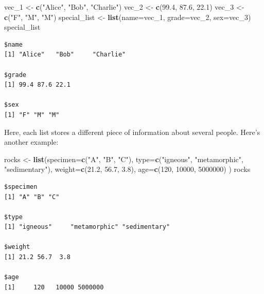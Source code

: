 \documentclass[
]{article}
\newenvironment{Shaded}{\begin{snugshade}}{\end{snugshade}}
\newcommand{\DataTypeTok}[1]{\textcolor[rgb]{0.13,0.29,0.53}{#1}}
\newcommand{\DecValTok}[1]{\textcolor[rgb]{0.00,0.00,0.81}{#1}}
\newcommand{\FloatTok}[1]{\textcolor[rgb]{0.00,0.00,0.81}{#1}}
\newcommand{\KeywordTok}[1]{\textcolor[rgb]{0.13,0.29,0.53}{\textbf{#1}}}
\newcommand{\NormalTok}[1]{#1}
\newcommand{\StringTok}[1]{\textcolor[rgb]{0.31,0.60,0.02}{#1}}
\begin{document}
\begin{Shaded}
\begin{Highlighting}[]
\NormalTok{vec_}\DecValTok{1}\NormalTok{ <-}\StringTok{ }\KeywordTok{c}\NormalTok{(}\StringTok{"Alice"}\NormalTok{, }\StringTok{"Bob"}\NormalTok{, }\StringTok{"Charlie"}\NormalTok{)}
\NormalTok{vec_}\DecValTok{2}\NormalTok{ <-}\StringTok{ }\KeywordTok{c}\NormalTok{(}\FloatTok{99.4}\NormalTok{, }\FloatTok{87.6}\NormalTok{, }\FloatTok{22.1}\NormalTok{)}
\NormalTok{vec_}\DecValTok{3}\NormalTok{ <-}\StringTok{ }\KeywordTok{c}\NormalTok{(}\StringTok{"F"}\NormalTok{, }\StringTok{"M"}\NormalTok{, }\StringTok{"M"}\NormalTok{)}
\NormalTok{special_list <-}\StringTok{ }\KeywordTok{list}\NormalTok{(}\DataTypeTok{name=}\NormalTok{vec_}\DecValTok{1}\NormalTok{, }\DataTypeTok{grade=}\NormalTok{vec_}\DecValTok{2}\NormalTok{, }\DataTypeTok{sex=}\NormalTok{vec_}\DecValTok{3}\NormalTok{)}
\NormalTok{special_list}
\end{Highlighting}
\end{Shaded}

\begin{verbatim}
$name
[1] "Alice"   "Bob"     "Charlie"

$grade
[1] 99.4 87.6 22.1

$sex
[1] "F" "M" "M"
\end{verbatim}

Here, each list stores a different piece of information about several people.
Here's another example:

\begin{Shaded}
\begin{Highlighting}[]
\NormalTok{rocks <-}\StringTok{ }\KeywordTok{list}\NormalTok{(}\DataTypeTok{specimen=}\KeywordTok{c}\NormalTok{(}\StringTok{"A"}\NormalTok{, }\StringTok{"B"}\NormalTok{, }\StringTok{"C"}\NormalTok{),}
              \DataTypeTok{type=}\KeywordTok{c}\NormalTok{(}\StringTok{"igneous"}\NormalTok{, }\StringTok{"metamorphic"}\NormalTok{, }\StringTok{"sedimentary"}\NormalTok{),}
              \DataTypeTok{weight=}\KeywordTok{c}\NormalTok{(}\FloatTok{21.2}\NormalTok{, }\FloatTok{56.7}\NormalTok{, }\FloatTok{3.8}\NormalTok{),}
              \DataTypeTok{age=}\KeywordTok{c}\NormalTok{(}\DecValTok{120}\NormalTok{, }\DecValTok{10000}\NormalTok{, }\DecValTok{5000000}\NormalTok{)}
\NormalTok{              )}
\NormalTok{rocks}
\end{Highlighting}
\end{Shaded}

\begin{verbatim}
$specimen
[1] "A" "B" "C"

$type
[1] "igneous"     "metamorphic" "sedimentary"

$weight
[1] 21.2 56.7  3.8

$age
[1]     120   10000 5000000
\end{verbatim}
\end{document}
